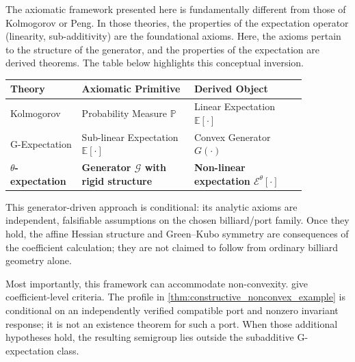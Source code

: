 \documentclass[12pt, letterpaper]{amsart}
\newcommand{\ThetaExpectation}{$\theta$-expectation}
\newcommand{\Ecal}{\mathcal{E}}
\theoremstyle{plain}
\theoremstyle{definition}
\theoremstyle{remark}
\begin{document}
The axiomatic framework presented here is fundamentally different from those of Kolmogorov or Peng. In those theories, the properties of the expectation operator (linearity, sub-additivity) are the foundational axioms. Here, the axioms pertain to the structure of the generator, and the properties of the expectation are derived theorems. The table below highlights this conceptual inversion.

\begin{center}
\small
\begin{tabular}{L{0.18\linewidth}|L{0.34\linewidth}|L{0.34\linewidth}}
\hline
\textbf{Theory} & \textbf{Axiomatic Primitive} & \textbf{Derived Object} \\
\hline
Kolmogorov & Probability Measure $\mathbb{P}$ & Linear Expectation $\mathbb{E}[\cdot]$ \\
G-Expectation & Sub-linear Expectation $\mathbb{E}[\cdot]$ & Convex Generator $G(\cdot)$ \\
\textbf{\ThetaExpectation{}} & \textbf{Generator $\mathcal{G}$ with rigid structure} & \textbf{Non-linear expectation $\Ecal^\theta[\cdot]$} \\
\hline
\end{tabular}
\end{center}

This generator-driven approach is conditional: its analytic axioms are independent, falsifiable assumptions on the chosen billiard/port family.  Once they hold, the affine Hessian structure and Green--Kubo symmetry are consequences of the coefficient calculation; they are not claimed to follow from ordinary billiard geometry alone.

Most importantly, this framework can accommodate non-convexity.   give coefficient-level criteria.  The profile in \cref{thm:constructive_nonconvex_example} is conditional on an independently verified compatible port and nonzero invariant response; it is not an existence theorem for such a port.  When those additional hypotheses hold, the resulting semigroup lies outside the subadditive G-expectation class.
\end{document}
